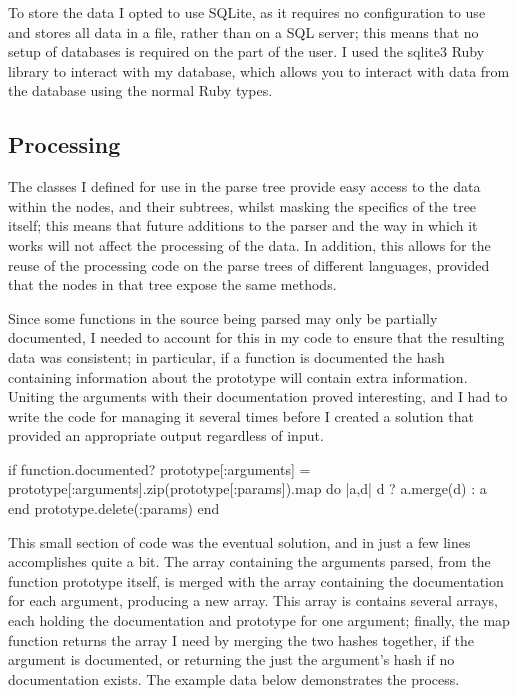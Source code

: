 To store the data I opted to use SQLite, as it requires no configuration to use
and stores all data in a file, rather than on a SQL server; this means that no
setup of databases is required on the part of the user. I used the
sqlite3\cite{website:sqlite} Ruby library to interact with my database, which
allows you to interact with data from the database using the normal Ruby types.

  \subsection{Processing}
    The classes I defined for use in the parse tree provide easy access to the
    data within the nodes, and their subtrees, whilst masking the specifics of
    the tree itself; this means that future additions to the parser and the way
    in which it works will not affect the processing of the data. In addition,
    this allows for the reuse of the processing code on the parse trees of
    different languages, provided that the nodes in that tree expose the same
    methods.

    Since some functions in the source being parsed may only be partially
    documented, I needed to account for this in my code to ensure that the
    resulting data was consistent; in particular, if a function is documented
    the hash containing information about the prototype will contain extra
    information. Uniting the arguments with their documentation proved
    interesting, and I had to write the code for managing it several times
    before I created a solution that provided an appropriate output regardless
    of input.

    \begin{code}[language=ruby, gobble=6]
      if function.documented?
        prototype[:arguments] = prototype[:arguments].zip(prototype[:params]).map do |a,d|
          d ? a.merge(d) : a
        end
        prototype.delete(:params)
      end
    \end{code}

    This small section of code was the eventual solution, and in just a few
    lines accomplishes quite a bit. The array containing the arguments
    parsed, from the function prototype itself, is merged with the array
    containing the documentation for each argument, producing a new array. This
    array is contains several arrays, each holding the documentation and
    prototype for one argument; finally, the map function returns the array I
    need by merging the two hashes together, if the argument is documented, or
    returning the just the argument's hash if no documentation exists. The
    example data below demonstrates the process.

